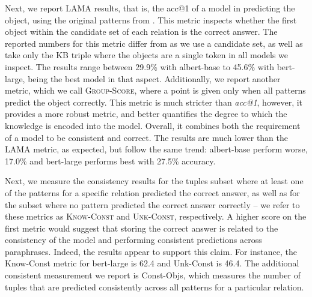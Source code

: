 Next, we report LAMA results, that is, the acc@1 of a model in predicting the object, using the original patterns from \citet{lama}. This metric inspects whether the first object within the candidate set of each relation is the correct answer. The reported numbers for this metric differ from \citet{lama} as we use a candidate set, as well as take only the KB triple where the objects are a single token in all models we inspect. The results range between 29.9\% with albert-base to 45.6\% with bert-large, being the best model in that aspect.
Additionally, we report another metric, which we call \textsc{Group-Score}, where a point is given only when all patterns predict the object correctly. This metric is much stricter than \textit{acc@1}, however, it provides a more robust metric, and better quantifies the degree to which the knowledge is encoded into the model. Overall, it combines both the requirement of a model to be consistent and correct. The results are much lower than the LAMA metric, as expected, but follow the same trend: albert-base perform worse, 17.0\% and bert-large performs best with 27.5\% accuracy.

Next, we measure the consistency results for the tuples
subset where at least one of the patterns for a specific
relation predicted the correct answer, as well as for the
subset where no pattern predicted the correct answer correctly -- we refer to these metrics as \textsc{Know-Const} and \textsc{Unk-Const}, respectively.
A higher score on the first metric would suggest that storing the correct answer is related to the consistency of the model and performing consistent predictions across paraphrases.
Indeed, the results appear to support this claim. For instance, the Know-Const metric for bert-large is 62.4 and Unk-Const is 46.4. 
The additional consistent measurement we report is Const-Objs, which measures the number of tuples that are predicted consistently across all patterns for a particular relation.




